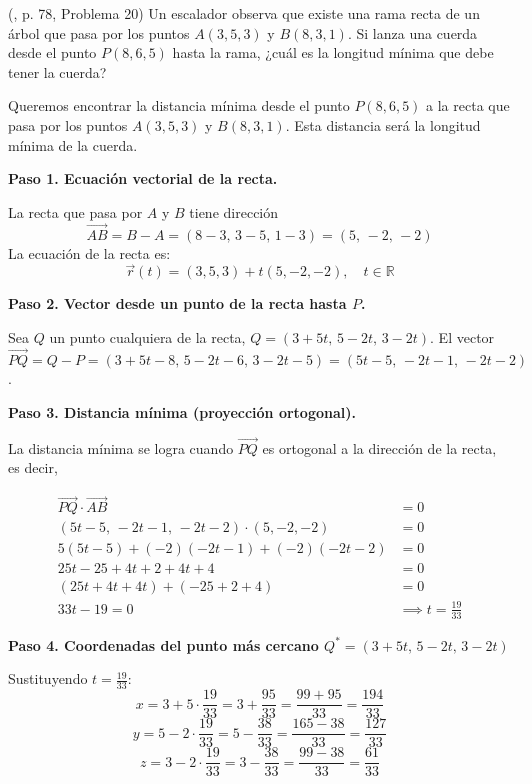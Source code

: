 \begin{prob} (\cite{espinoza2006Algebralineal}, p. 78, Problema 20) Un escalador observa que existe una rama recta de un árbol que pasa por los puntos $A(3,5,3)$ y $B(8,3,1)$. Si lanza una cuerda desde el punto $P(8,6,5)$ hasta la rama, ¿cuál es la longitud mínima que debe tener la cuerda?

\begin{myproof}
Queremos encontrar la distancia mínima desde el punto $P(8,6,5)$ a la recta que pasa por los puntos $A(3,5,3)$ y $B(8,3,1)$. Esta distancia será la longitud mínima de la cuerda.

\textbf{Paso 1. Ecuación vectorial de la recta.}

La recta que pasa por $A$ y $B$ tiene dirección
\[
\overrightarrow{AB} = B - A = (8-3,\, 3-5,\, 1-3) = (5,\,-2,\,-2)
\]
La ecuación de la recta es:
\[
\overrightarrow{r}(t) = (3,5,3) + t(5,-2,-2), \quad t \in \mathbb{R}
\]

\textbf{Paso 2. Vector desde un punto de la recta hasta $P$.}

Sea $Q$ un punto cualquiera de la recta, $Q = (3+5t,\, 5-2t,\, 3-2t)$.  
El vector $\overrightarrow{PQ} = Q - P = (3+5t-8,\, 5-2t-6,\, 3-2t-5) = (5t-5,\, -2t-1,\, -2t-2)$.

\textbf{Paso 3. Distancia mínima (proyección ortogonal).}

La distancia mínima se logra cuando $\overrightarrow{PQ}$ es ortogonal a la dirección de la recta, es decir,

\begin{align*}
\overrightarrow{PQ} \cdot \overrightarrow{AB} &= 0\\
(5t-5,\, -2t-1,\, -2t-2) \cdot (5, -2, -2) &= 0\\
5(5t-5) + (-2)(-2t-1) + (-2)(-2t-2) &= 0\\
25t - 25 + 4t + 2 + 4t + 4 &= 0\\
(25t + 4t + 4t) + (-25 + 2 + 4) &= 0\\
33t - 19 = 0 &\implies t = \frac{19}{33}
\end{align*}



\textbf{Paso 4. Coordenadas del punto más cercano $Q^*=(3 + 5t,\, 5 - 2t,\, 3 - 2t)$}

Sustituyendo $t = \frac{19}{33}$:
\[
x = 3 + 5 \cdot \frac{19}{33} = 3 + \frac{95}{33} = \frac{99 + 95}{33} = \frac{194}{33}
\]
\[
y = 5 - 2 \cdot \frac{19}{33} = 5 - \frac{38}{33} = \frac{165 - 38}{33} = \frac{127}{33}
\]
\[
z = 3 - 2 \cdot \frac{19}{33} = 3 - \frac{38}{33} = \frac{99 - 38}{33} = \frac{61}{33}
\]


\end{myproof}
\end{prob}
